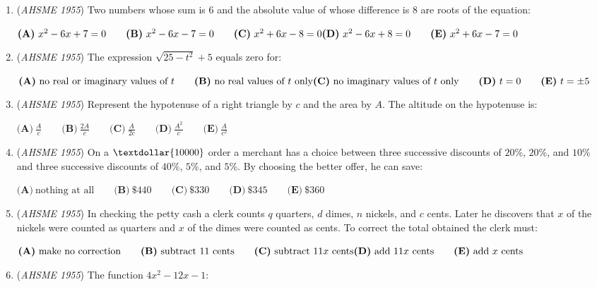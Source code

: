 \begin{enumerate}
	\item (\textit{AHSME 1955}) Two numbers whose sum is $6$ and the absolute value of whose difference is $8$ are roots of the equation: 


 $\textbf{(A)}\ x^2-6x+7=0\qquad\textbf{(B)}\ x^2-6x-7=0\qquad\textbf{(C)}\ x^2+6x-8=0\\ \textbf{(D)}\ x^2-6x+8=0\qquad\textbf{(E)}\ x^2+6x-7=0$


	\item (\textit{AHSME 1955}) The expression $\sqrt{25-t^2}+5$ equals zero for: 


 $\textbf{(A)}\ \text{no real or imaginary values of }t\qquad\textbf{(B)}\ \text{no real values of }t\text{ only}\\ \textbf{(C)}\ \text{no imaginary values of }t\text{ only}\qquad\textbf{(D)}\ t=0\qquad\textbf{(E)}\ t=\pm 5$


	\item (\textit{AHSME 1955}) Represent the hypotenuse of a right triangle by $c$ and the area by $A$. The altitude on the hypotenuse is: 


 $\textbf{(A)}\ \frac{A}{c}\qquad\textbf{(B)}\ \frac{2A}{c}\qquad\textbf{(C)}\ \frac{A}{2c}\qquad\textbf{(D)}\ \frac{A^2}{c}\qquad\textbf{(E)}\ \frac{A}{c^2}$


	\item (\textit{AHSME 1955}) On a $\textdollar{10000}$ order a merchant has a choice between three successive discounts of $20$\%, $20$\%, and $10$\% and 
three successive discounts of $40$\%, $5$\%, and $5$\%. By choosing the better offer, he can save: 


 $\textbf{(A)}\ \text{nothing at all}\qquad\textbf{(B)}\ \$440\qquad\textbf{(C)}\ \$330\qquad\textbf{(D)}\ \$345\qquad\textbf{(E)}\ \$360$


	\item (\textit{AHSME 1955}) In checking the petty cash a clerk counts $q$ quarters, $d$ dimes, $n$ nickels, and $c$ cents. 
Later he discovers that $x$ of the nickels were counted as quarters and $x$ of the dimes were counted as cents. 
To correct the total obtained the clerk must: 


 $\textbf{(A)}\ \text{make no correction}\qquad\textbf{(B)}\ \text{subtract 11 cents}\qquad\textbf{(C)}\ \text{subtract 11}x\text{ cents}\\ \textbf{(D)}\ \text{add 11}x\text{ cents}\qquad\textbf{(E)}\ \text{add }x\text{ cents}$


	\item (\textit{AHSME 1955}) The function $4x^2-12x-1$: 



\end{enumerate}

